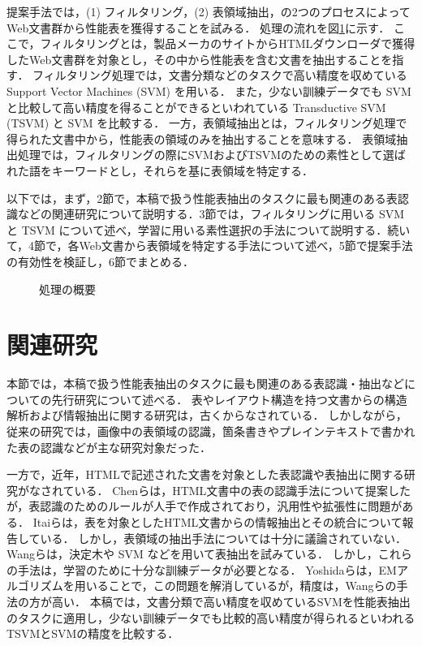 提案手法では，(1) フィルタリング，(2) 表領域抽出，の2つのプロセスによってWeb文書群から性能表を獲得することを試みる．
処理の流れを図\ref{outline}に示す．
ここで，フィルタリングとは，製品メーカのサイトからHTMLダウンローダで獲得したWeb文書群を対象とし，その中から性能表を含む文書を抽出することを指す．
フィルタリング処理では，文書分類などのタスクで高い精度を収めている Support Vector Machines (SVM) を用いる．
また，少ない訓練データでも SVM と比較して高い精度を得ることができるといわれている Transductive SVM (TSVM) と SVM を比較する．
一方，表領域抽出とは，フィルタリング処理で得られた文書中から，性能表の領域のみを抽出することを意味する．
表領域抽出処理では，フィルタリングの際にSVMおよびTSVMのための素性として選ばれた語をキーワードとし，それらを基に表領域を特定する．

以下では，まず，2節で，本稿で扱う性能表抽出のタスクに最も関連のある表認識などの関連研究について説明する．3節では，フィルタリングに用いる SVM と TSVM について述べ，学習に用いる素性選択の手法について説明する．続いて，4節で，各Web文書から表領域を特定する手法について述べ，5節で提案手法の有効性を検証し，6節でまとめる．

\begin{figure}
\begin{center}
\end{center}
\vspace{-3mm}
\caption{処理の概要}
\label{outline}
\end{figure}

\section{関連研究}
本節では，本稿で扱う性能表抽出のタスクに最も関連のある表認識・抽出などについての先行研究について述べる．
表やレイアウト構造を持つ文書からの構造解析および情報抽出に関する研究は，古くからなされている．
しかしながら，従来の研究では，画像中の表領域の認識，箇条書きやプレインテキストで書かれた表の認識などが主な研究対象だった\cite[など]{hu,kawai,ng,pinto,sato}．

一方で，近年，HTMLで記述された文書を対象とした表認識や表抽出に関する研究がなされている．
Chenら\cite{chen}は，HTML文書中の表の認識手法について提案したが，表認識のためのルールが人手で作成されており，汎用性や拡張性に問題がある．
Itaiら\cite{itai}は，表を対象としたHTML文書からの情報抽出とその統合について報告している．
しかし，表領域の抽出手法については十分に議論されていない．
Wangら\cite{wang}は，決定木や SVM などを用いて表抽出を試みている．
しかし，これらの手法は，学習のために十分な訓練データが必要となる．
Yoshidaら\cite{yoshida}は，EMアルゴリズムを用いることで，この問題を解消しているが，精度は，Wangらの手法の方が高い．
本稿では，文書分類で高い精度を収めているSVMを性能表抽出のタスクに適用し，少ない訓練データでも比較的高い精度が得られるといわれるTSVMとSVMの精度を比較する．

